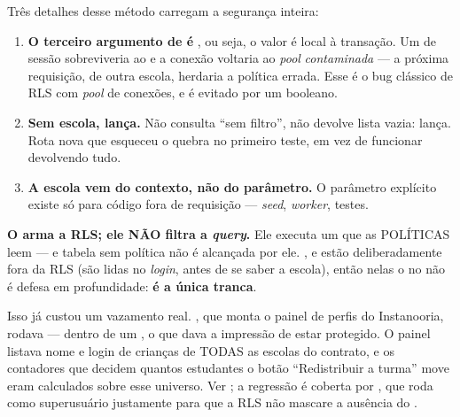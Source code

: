 Três detalhes desse método carregam a segurança inteira:

\begin{enumerate}
  \item \textbf{O terceiro argumento de  é }, ou seja,
    o valor é local à transação. Um  de sessão sobreviveria ao
     e a conexão voltaria ao \emph{pool} \emph{contaminada} --- a
    próxima requisição, de outra escola, herdaria a política errada. Esse é o bug
    clássico de RLS com \emph{pool} de conexões, e é evitado por um booleano.
  \item \textbf{Sem escola, lança.} Não consulta \enquote{sem filtro}, não
    devolve lista vazia: lança. Rota nova que esqueceu o  quebra no
    primeiro teste, em vez de funcionar devolvendo tudo.
  \item \textbf{A escola vem do contexto, não do parâmetro.} O parâmetro
    explícito existe só para código fora de requisição --- \emph{seed},
    \emph{worker}, testes.
\end{enumerate}

\begin{regra}
\textbf{O  arma a RLS; ele NÃO filtra a \emph{query}.} Ele
executa um  que as POLÍTICAS leem --- e tabela sem política não
é alcançada por ele. ,  e  estão
deliberadamente fora da RLS (são lidas no \emph{login}, antes de se saber a
escola), então nelas o  no  não é defesa em
profundidade: \textbf{é a única tranca}.

Isso já custou um vazamento real. , que monta o painel
de perfis do Instanooria, rodava  --- dentro de um , o que dava a impressão de
estar protegido. O painel listava nome e login de crianças de TODAS as escolas do
contrato, e os contadores que decidem quantos estudantes o botão
\enquote{Redistribuir a turma} move eram calculados sobre esse universo. Ver
; a regressão é coberta por
, que roda como superusuário
justamente para que a RLS não mascare a ausência do .
\end{regra}

